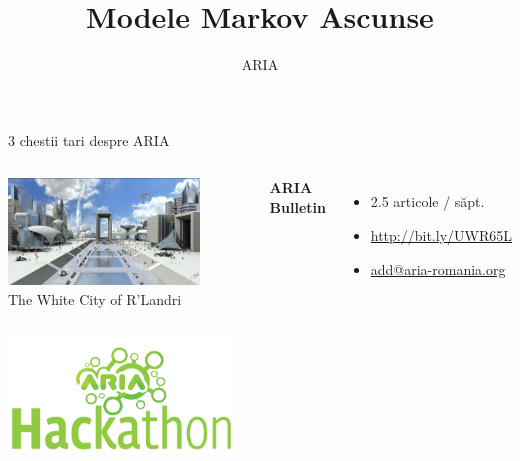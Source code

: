 \documentclass{beamer}
\title[Modele Markov Ascunse]{Modele Markov Ascunse}
\author[ARIA]{ARIA}
\begin{document}

\begin{frame}[t]
	\begin{center}
		\Large{3 chestii tari despre ARIA}
	\end{center}%
	\pause
	
	\begin{columns}
			\begin{center}
				\includegraphics[width=0.8\textwidth]{graphics/intro/rlandri}\\%
				\small{The White City of R'Landri}
			\end{center}
			\pause
			\textbf{ARIA Bulletin}%
			\vspace*{0.25em}
			\begin{itemize}
				\item 2.5 articole / săpt.
				\item \small{\url{http://bit.ly/UWR65L}}
				\pause
				\item \small{\url{add@aria-romania.org}}
			\end{itemize}
	\end{columns}
	\pause	
	
	\begin{center}
		\includegraphics[width=0.45\textwidth]{graphics/intro/aria-hackathon}%
	\end{center}
\end{frame}
\end{document}
